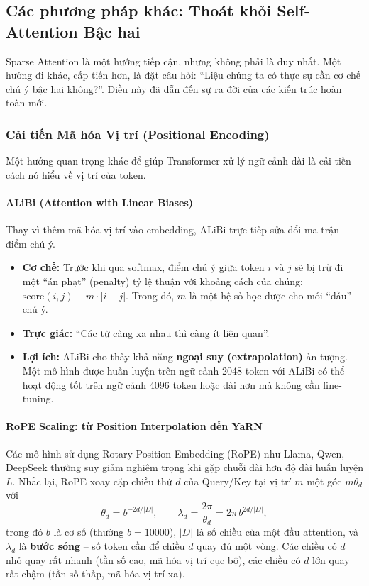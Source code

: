 \subsection{Các phương pháp khác: Thoát khỏi Self-Attention Bậc hai}
\label{ssec:other_long_context_methods}

Sparse Attention là một hướng tiếp cận, nhưng không phải là duy nhất. Một hướng đi khác, cấp tiến hơn, là đặt câu hỏi: “Liệu chúng ta có thực sự cần cơ chế chú ý bậc hai không?”. Điều này đã dẫn đến sự ra đời của các kiến trúc hoàn toàn mới.
\subsubsection{Cải tiến Mã hóa Vị trí (Positional Encoding)}
Một hướng quan trọng khác để giúp Transformer xử lý ngữ cảnh dài là cải tiến cách nó hiểu về vị trí của token.
\paragraph{ALiBi (Attention with Linear Biases)}
Thay vì thêm mã hóa vị trí vào embedding, ALiBi \cite{press2021train} trực tiếp sửa đổi ma trận điểm chú ý.
\begin{itemize}
    \item \textbf{Cơ chế:} Trước khi qua softmax, điểm chú ý giữa token $i$ và $j$ sẽ bị trừ đi một “án phạt” (penalty) tỷ lệ thuận với khoảng cách của chúng: $\text{score}(i, j) - m \cdot |i - j|$. Trong đó, $m$ là một hệ số học được cho mỗi “đầu” chú ý.
    \item \textbf{Trực giác:} “Các từ càng xa nhau thì càng ít liên quan”.
    \item \textbf{Lợi ích:} ALiBi cho thấy khả năng \textbf{ngoại suy (extrapolation)} ấn tượng. Một mô hình được huấn luyện trên ngữ cảnh 2048 token với ALiBi có thể hoạt động tốt trên ngữ cảnh 4096 token hoặc dài hơn mà không cần fine-tuning.
\end{itemize}

\paragraph{RoPE Scaling: từ Position Interpolation đến YaRN \newtag}
Các mô hình sử dụng Rotary Position Embedding (RoPE) như Llama, Qwen, DeepSeek thường suy giảm nghiêm trọng khi gặp chuỗi dài hơn độ dài huấn luyện $L$. Nhắc lại, RoPE xoay cặp chiều thứ $d$ của Query/Key tại vị trí $m$ một góc $m\theta_d$ với
\[
\theta_d = b^{-2d/|D|}, \qquad \lambda_d = \frac{2\pi}{\theta_d} = 2\pi\, b^{2d/|D|},
\]
trong đó $b$ là cơ số (thường $b = 10000$), $|D|$ là số chiều của một đầu attention, và $\lambda_d$ là \textbf{bước sóng} -- số token cần để chiều $d$ quay đủ một vòng. Các chiều có $d$ nhỏ quay rất nhanh (tần số cao, mã hóa vị trí cục bộ), các chiều có $d$ lớn quay rất chậm (tần số thấp, mã hóa vị trí xa).

